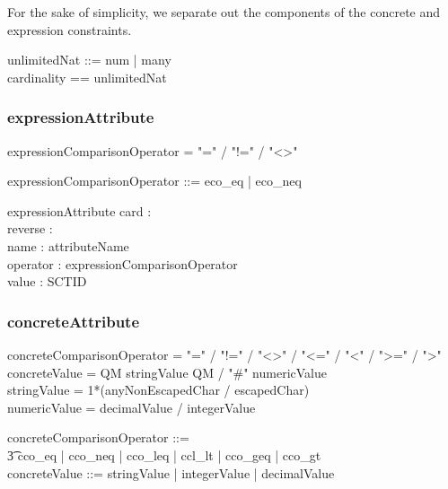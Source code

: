 \documentclass{article}
\def\bnf#1{{\scriptsize {{#1}} }}
\begin{document}
For the sake of simplicity, we separate out the components of the concrete and expression constraints.

\begin{zed}
unlimitedNat ::= num \ldata \nat \rdata | many \\
cardinality == \nat \cross unlimitedNat \\
[reverseFlag] 
\end{zed}

\subsubsection{expressionAttribute}
\begin{framed}
\noindent
\bnf{expressionComparisonOperator = "=" / "!=" / "\textless\textgreater"}
\end{framed}
\begin{zed}
expressionComparisonOperator ::= eco\_eq | eco\_neq
\end{zed}


\begin{schema}{expressionAttribute}
	card : \optional[cardinality] \\
	reverse : \optional[reverseFlag] \\
	name : attributeName \\
	operator : expressionComparisonOperator \\
	value : SCTID
\end{schema}


\subsubsection{concreteAttribute}
\begin{framed}
\noindent
\bnf{concreteComparisonOperator = "=" / "!=" /  "\textless\textgreater" / "\textless=" / "\textless" / "\textgreater=" / "\textgreater"} \\
\bnf{concreteValue =  QM stringValue QM / "\#" numericValue} \\
\bnf{stringValue = 1*(anyNonEscapedChar / escapedChar)} \\
\bnf{numericValue = decimalValue / integerValue}
\end{framed}
\begin{zed}
concreteComparisonOperator ::= \\
\t3 cco\_eq | cco\_neq | cco\_leq | ccl\_lt | cco\_geq | cco\_gt \\
concreteValue ::= stringValue | integerValue | decimalValue
\end{zed}
\end{document}
